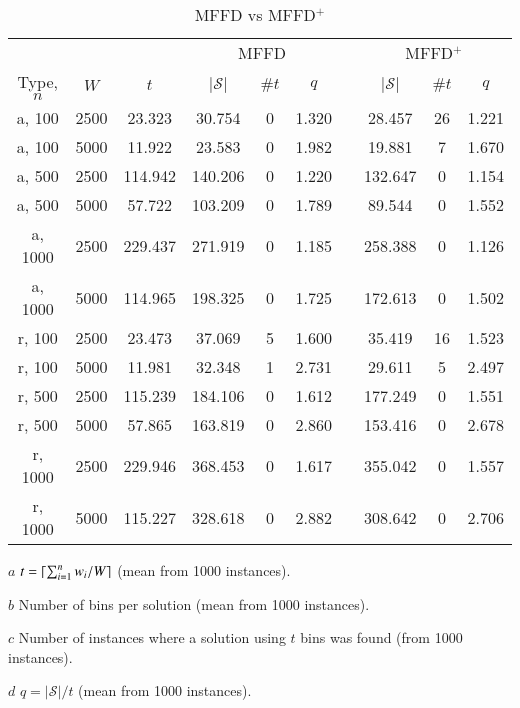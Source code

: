 \documentclass[authoryear]{elsarticle}
\begin{document}
\begin{table}[h!]
\centering
\caption{MFFD vs MFFD$^+$}
\begin{threeparttable}
\begin{tabular}{c@{\hspace{20pt}}c@{\hspace{20pt}}c@{\hspace{20pt}}c@{\hspace{20pt}}c@{\hspace{20pt}}ccc@{\hspace{20pt}}c@{\hspace{20pt}}c@{\hspace{8pt}}}\toprule
	& & & \multicolumn{3}{c}{MFFD} &\phantom{a}& \multicolumn{3}{c}{MFFD$^+$}\\
	\cmidrule{4-6} \cmidrule{8-10}
	Type, $n$ & $W$ & $t$\tnote{$a$} & $|\mathcal{S}|$\tnote{$b$} & $\# t$\tnote{$c$} & $q$\tnote{$d$} && $|\mathcal{S}|$ & $\# t$ & $q$\\ \midrule	
	a, 100 & 2500 & 23.323 & 30.754 & 0 & 1.320 && 28.457 & 26 & 1.221 \\
	a, 100 & 5000 & 11.922 & 23.583 & 0 & 1.982 && 19.881 & 7 & 1.670  \\
	\midrule
	a, 500 & 2500 & 114.942 & 140.206 & 0 & 1.220 && 132.647 & 0 & 1.154 \\
	a, 500 & 5000 & 57.722 & 103.209 & 0 & 1.789 && 89.544 & 0 & 1.552 \\
	\midrule
	a, 1000 & 2500 & 229.437 & 271.919 & 0 & 1.185 && 258.388 & 0 & 1.126 \\
	a, 1000 & 5000 & 114.965 & 198.325 & 0 & 1.725 && 172.613 & 0 & 1.502 \\
	\midrule
	\midrule
	r, 100 & 2500 & 23.473 & 37.069 & 5 & 1.600 && 35.419 & 16 & 1.523 \\
	r, 100 & 5000 & 11.981 & 32.348 & 1 & 2.731 && 29.611 & 5 & 2.497 \\
	\midrule
	r, 500 & 2500 & 115.239 & 184.106 & 0 & 1.612 && 177.249 & 0 & 1.551 \\
	r, 500 & 5000 & 57.865 & 163.819 & 0 & 2.860 && 153.416 & 0 & 2.678 \\
	\midrule
	r, 1000 & 2500 & 229.946 & 368.453 & 0 & 1.617 && 355.042 & 0 & 1.557 \\
	r, 1000 & 5000 & 115.227 & 328.618 & 0 & 2.882 && 308.642 & 0 & 2.706 \\
	\bottomrule
\end{tabular}
\vspace{0.2cm} %
\begin{tablenotes}
	\item[$a$] $t = \lceil\sum_{i=1}^{n} w_i / W\rceil$ (mean from 1000 instances).
	\item[$b$] Number of bins per solution (mean from 1000 instances).
	\item[$c$] Number of instances where a solution using $t$ bins was found (from 1000 instances).
	\item[$d$] $q = |\mathcal{S}| /t$ (mean from 1000 instances).
\end{tablenotes}	
\end{threeparttable}	
\label{table:heuristics}
\end{table}
\end{document}
